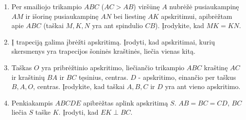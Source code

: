 \begin{enumerate}
\item Per smailiojo trikampio $ABC$ ($AC>AB$) viršūnę $A$
  nubrėžė pusiaukampinę $AM$ ir išorinę pusiaukampinę $AN$
  bei liestinę $AK$ apskritimui, apibrėžtam apie $ABC$
  (taškai $M,K,N$ yra ant spindulio $CB$). Įrodykite, kad
  $MK=KN$. 
\item Į trapeciją galima įbrėžti apskritimą. Įrodyti, kad
  apskritimai, kurių skersmenys yra trapecijos šoninės
  kraštinės, liečia vienas kitą.
\item Taškas $O$ yra pribrėžtinio apskritimo, liečiančio
  trikampio $ABC$ kraštinę $AC$ ir kraštinių $BA$ ir $BC$
  tęsinius, centras. $D$ - apskritimo, einančio per taškus
  $B, A, O$, centras. Įrodykite, kad taškai $A, B, C$ ir $D$
  yra ant vieno apskritimo. 
\item Penkiakampis $ABCDE$ apibrėžtas aplink apskritimą $S$.
  $AB=BC=CD$, $BC$ liečia $S$ taške $K$. Įrodyti, kad
  $EK\perp BC$.

\end{enumerate}
